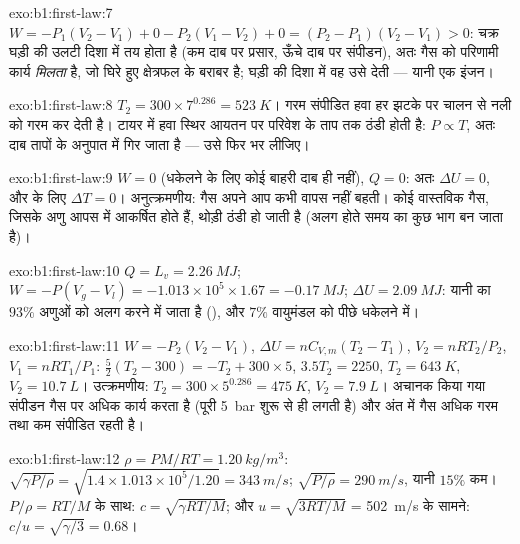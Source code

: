\begin{solution}{exo:b1:first-law:7}
$W = -P_1(V_2 - V_1) + 0 - P_2(V_1 - V_2) + 0 = (P_2 - P_1)(V_2 - V_1) > 0$:
चक्र घड़ी की उलटी दिशा में तय होता है (कम दाब पर प्रसार, ऊँचे दाब पर
संपीडन), अतः गैस को परिणामी कार्य \emph{मिलता} है, जो घिरे हुए क्षेत्रफल के
बराबर है; घड़ी की दिशा में वह उसे देती --- यानी एक इंजन।
\end{solution}

\begin{solution}{exo:b1:first-law:8}
$T_2 = 300 \times 7^{0.286} = \qty{523}{K}$। गरम संपीडित हवा हर झटके पर चालन
से नली को गरम कर देती है। टायर में हवा स्थिर आयतन पर परिवेश के ताप तक ठंडी
होती है: $P \propto T$, अतः दाब तापों के अनुपात में गिर जाता है --- उसे फिर
भर लीजिए।
\end{solution}

\begin{solution}{exo:b1:first-law:9}
$W = 0$ (धकेलने के लिए कोई बाहरी दाब ही नहीं), $Q = 0$: अतः $\Delta U = 0$,
और  के लिए $\Delta T = 0$। अनुत्क्रमणीय: गैस अपने आप कभी वापस नहीं
बहती। कोई वास्तविक गैस, जिसके अणु आपस में आकर्षित होते हैं, थोड़ी ठंडी हो
जाती है (अलग होते समय  का कुछ भाग  बन जाता है)।
\end{solution}

\begin{solution}{exo:b1:first-law:10}
$Q = L_v = \qty{2.26}{MJ}$; $W = -P(V_g - V_l) = -1.013\times10^5 \times 1.67 =
\qty{-0.17}{MJ}$; $\Delta U = \qty{2.09}{MJ}$: यानी  का $93\%$ अणुओं को
अलग करने में जाता है (), और $7\%$ वायुमंडल को पीछे धकेलने में।
\end{solution}

\begin{solution}{exo:b1:first-law:11}
$W = -P_2(V_2 - V_1)$, $\Delta U = nC_{V,m}(T_2 - T_1)$, $V_2 = nRT_2/P_2$, $V_1
= nRT_1/P_1$: $\tfrac52(T_2 - 300) = -T_2 + 300 \times 5$, $3.5T_2 = 2250$,
$T_2 = \qty{643}{K}$, $V_2 = \qty{10.7}{L}$। उत्क्रमणीय: $T_2 = 300 \times
5^{0.286} = \qty{475}{K}$, $V_2 = \qty{7.9}{L}$। अचानक किया गया संपीडन गैस पर
अधिक कार्य करता है (पूरी \qty{5}{bar} शुरू से ही लगती है) और अंत में गैस
अधिक गरम तथा कम संपीडित रहती है।
\end{solution}

\begin{solution}{exo:b1:first-law:12}
$\rho = PM/RT = \qty{1.20}{kg/m^3}$: $\sqrt{\gamma P/\rho} = \sqrt{1.4 \times
1.013\times10^5/1.20} = \qty{343}{m/s}$; $\sqrt{P/\rho} = \qty{290}{m/s}$, यानी $15\%$
कम। $P/\rho = RT/M$ के साथ: $c = \sqrt{\gamma RT/M}$; और $u = \sqrt{3RT/M}$
= \qty{502}{m/s} के सामने: $c/u = \sqrt{\gamma/3} = 0.68$।
\end{solution}

